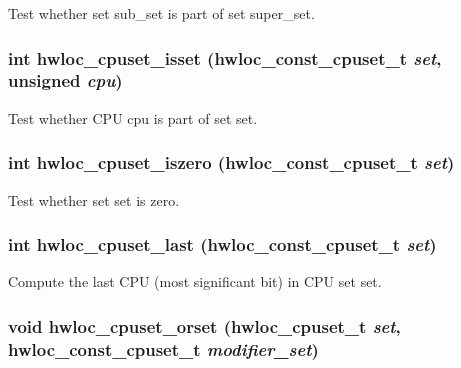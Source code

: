 Test whether set {\ttfamily sub\_\-set} is part of set {\ttfamily super\_\-set}. \hypertarget{group__hwlocality__cpuset_ga0632cf820ffa41df6f64dcd14fd0d541}{
\subsubsection[{hwloc\_\-cpuset\_\-isset}]{\setlength{\rightskip}{0pt plus 5cm}int hwloc\_\-cpuset\_\-isset ({\bf hwloc\_\-const\_\-cpuset\_\-t} {\em set}, \/  unsigned {\em cpu})}}
\label{group__hwlocality__cpuset_ga0632cf820ffa41df6f64dcd14fd0d541}


Test whether CPU {\ttfamily cpu} is part of set {\ttfamily set}. \hypertarget{group__hwlocality__cpuset_ga0c2a23ccf879c9e640a3a407bed94090}{
\subsubsection[{hwloc\_\-cpuset\_\-iszero}]{\setlength{\rightskip}{0pt plus 5cm}int hwloc\_\-cpuset\_\-iszero ({\bf hwloc\_\-const\_\-cpuset\_\-t} {\em set})}}
\label{group__hwlocality__cpuset_ga0c2a23ccf879c9e640a3a407bed94090}


Test whether set {\ttfamily set} is zero. \hypertarget{group__hwlocality__cpuset_ga2a18b213d53e23342ebc5ec3fde508ba}{
\subsubsection[{hwloc\_\-cpuset\_\-last}]{\setlength{\rightskip}{0pt plus 5cm}int hwloc\_\-cpuset\_\-last ({\bf hwloc\_\-const\_\-cpuset\_\-t} {\em set})}}
\label{group__hwlocality__cpuset_ga2a18b213d53e23342ebc5ec3fde508ba}


Compute the last CPU (most significant bit) in CPU set {\ttfamily set}. \hypertarget{group__hwlocality__cpuset_gaae983503932659b0c4142716201d8f40}{
\subsubsection[{hwloc\_\-cpuset\_\-orset}]{\setlength{\rightskip}{0pt plus 5cm}void hwloc\_\-cpuset\_\-orset ({\bf hwloc\_\-cpuset\_\-t} {\em set}, \/  {\bf hwloc\_\-const\_\-cpuset\_\-t} {\em modifier\_\-set})}}
\label{group__hwlocality__cpuset_gaae983503932659b0c4142716201d8f40}


